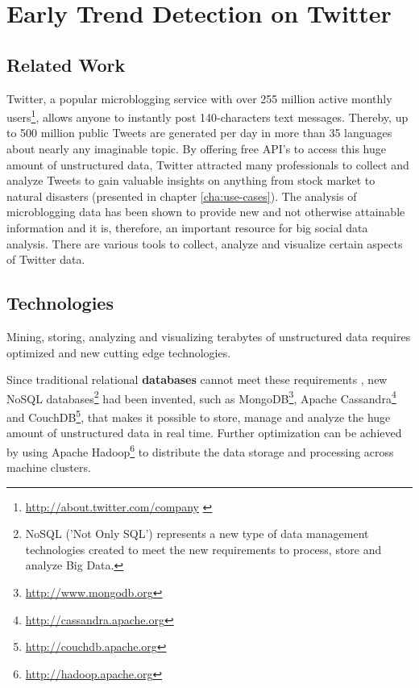 
\chapter{Early Trend Detection on Twitter}
\label{cha:early-detection}

\section{Related Work}
\label{sec:related-work}
Twitter, a popular microblogging service with over 255 million active monthly users\footnote{\url{http://about.twitter.com/company} \accessednote \label{aboutwitter}}, allows anyone to instantly post 140-characters text messages. Thereby, up to 500 million public Tweets are generated per day in more than 35 languages about nearly any imaginable topic. By offering free API’s to access this huge amount of unstructured data, Twitter attracted many professionals to collect and analyze Tweets to gain valuable insights on anything from stock market to natural disasters (presented in chapter \ref{cha:use-cases}). The analysis of microblogging data has been shown to provide new and not otherwise attainable information and it is, therefore, an important resource for big social data analysis. There are various tools to collect, analyze and visualize certain aspects of Twitter data.

\section{Technologies}
\label{sec:technologies}
Mining, storing, analyzing and visualizing terabytes of unstructured data requires optimized and new cutting edge technologies. 

Since traditional relational \textbf{databases} cannot meet these requirements \cite{TwitterDataAnalytics2013}, new NoSQL databases\footnote{NoSQL ('Not Only SQL') represents a new type of data management technologies created to meet the new requirements to process, store and analyze Big Data.} had been invented, such as MongoDB\footnote{\url{http://www.mongodb.org} \accessednote }, Apache Cassandra\footnote{\url{http://cassandra.apache.org} \accessednote} and CouchDB\footnote{\url{http://couchdb.apache.org} \accessednote}, that makes it possible to store, manage and analyze the huge amount of unstructured data in real time. Further optimization can be achieved by using Apache Hadoop\footnote{\url{http://hadoop.apache.org} \accessednote} to distribute the data storage and processing across machine clusters.

